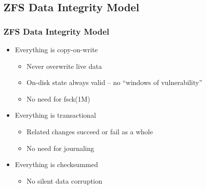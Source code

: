 \subsection{ZFS Data Integrity Model} %
\begin{frame}[fragile]
    \frametitle{ZFS Data Integrity Model}
    \begin{itemize}
        \item Everything is copy-on-write
        \begin{itemize}
            \item Never overwrite live data
            \item On-disk state always valid – no “windows of vulnerability”
            \item No need for fsck(1M)
        \end{itemize}
        \item Everything is transactional
        \begin{itemize}
            \item Related changes succeed or fail as a whole
            \item No need for journaling
        \end{itemize}
        \item Everything is checksummed
        \begin{itemize}
            \item No silent data corruption
        \end{itemize}
    \end{itemize}
\end{frame}
% 
% 
% 
% 
% 
